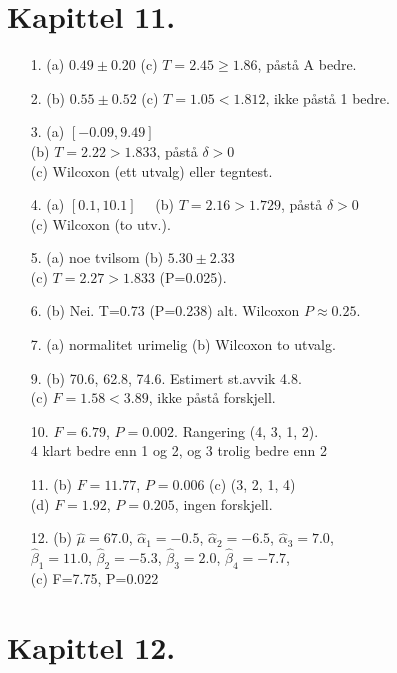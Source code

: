 \section*{Kapittel 11.}
\begin{itemize}                  
\item[1.]  (a) $0.49 \pm 0.20$   (c) $T=2.45 \geq 1.86$,  påstå A bedre.
\item[2.]  (b) $0.55 \pm 0.52$   (c) $T=1.05 < 1.812$, ikke påstå 1 bedre.
\item[3.]  (a) $[-0.09, 9.49]$ \ \                             \\
           (b) $T=2.22 > 1.833$, påstå $\delta > 0$\\
           (c) Wilcoxon (ett utvalg) eller tegntest.
\item[4.]  (a) $[0.1, 10.1]$ \ \  
           (b) $T=2.16 > 1.729$, påstå $\delta > 0$  \\ 
           (c) Wilcoxon (to utv.).
\item[5.]  (a) noe tvilsom   (b) $5.30 \pm 2.33$\\
           (c) $T=2.27 > 1.833$  (P=0.025).
\item[6.]  (b) Nei.  T=0.73  (P=0.238) alt.  Wilcoxon $P \approx 0.25$.
\item[7.]  (a) normalitet urimelig   (b) Wilcoxon to utvalg.
\item[9.]  (b) 70.6, 62.8, 74.6.  Estimert st.avvik 4.8.\\
           (c) $F=1.58 < 3.89$, ikke påstå forskjell.
\item[10.]  $F=6.79$, $P=0.002$. Rangering (4, 3, 1, 2).\\
           4 klart bedre enn 1 og 2, og 3 trolig bedre enn 2
\item[11.]  (b) $F=11.77$, $P=0.006$ (c) (3, 2, 1, 4) \\
            (d) $F=1.92$, $P=0.205$, ingen forskjell.
\item[12.]  (b) $\hat{\mu}=67.0$, $\hat{\alpha}_1 =-0.5$,
              $\hat{\alpha}_2 =-6.5$,  $\hat{\alpha}_3 =7.0$,\\
              $\hat{\beta}_1 =11.0$, $\hat{\beta}_2 =-5.3$,
              $\hat{\beta}_3 =2.0$,  $\hat{\beta}_4 =-7.7$,\\
              (c) F=7.75, P=0.022  
\end{itemize}         
         
         
\section*{Kapittel 12.}
         
